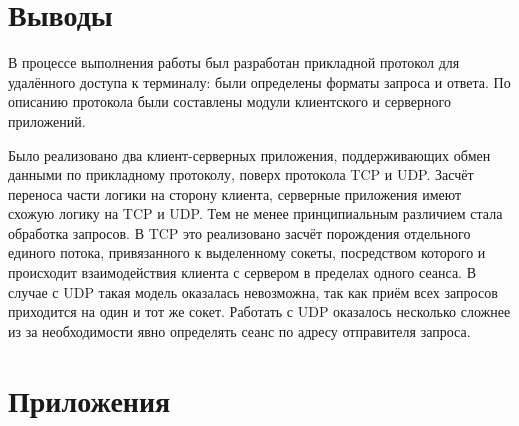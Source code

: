 \section{Выводы}

В процессе выполнения работы был разработан прикладной протокол для удалённого доступа к терминалу: были определены форматы запроса и ответа. По
описанию протокола были составлены модули клиентского и серверного приложений. 

Было реализовано два клиент-серверных приложения, поддерживающих обмен данными по прикладному протоколу, поверх протокола TCP и UDP. Засчёт переноса части логики на сторону клиента, серверные приложения имеют схожую логику на TCP и UDP. Тем не менее принципиальным различием стала обработка запросов. В TCP это реализовано засчёт порождения отдельного единого потока, привязанного к выделенному сокеты, посредством которого и происходит взаимодействия клиента с сервером в пределах одного сеанса. В случае с UDP такая модель оказалась невозможна, так как приём всех запросов приходится на один и тот же сокет. Работать с UDP оказалось несколько сложнее из за необходимости явно определять сеанс по адресу отправителя запроса.

\newpage

\section*{Приложения}












